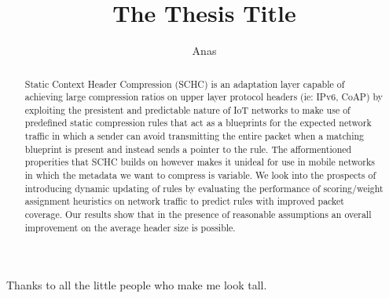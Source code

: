 \documentclass[12pt]{../dalthesis}
\begin{document}
\title{The Thesis Title}
\author{Anas}

\bcshon  %





\nolistoftables
\nolistoffigures

\frontmatter

\begin{abstract}
	Static Context Header Compression (SCHC) is an adaptation layer
		capable of achieving large compression ratios on upper layer protocol headers (ie: IPv6, CoAP) by exploiting the presistent and predictable nature of 
		IoT networks to make use of predefined static compression rules that act as a blueprints for the 
		expected network traffic in which a sender can avoid transmitting the entire packet when a matching blueprint is present and instead sends a pointer to the rule. The 
		afformentioned properities that SCHC builds on however makes it unideal for use in mobile networks in which the metadata we want to compress is variable.
		We look into the prospects of introducing dynamic updating of rules by evaluating the performance of scoring/weight assignment heuristics on
		network traffic to predict rules with improved packet coverage. Our results show that in the presence of reasonable assumptions an overall 
		improvement on the average header size is possible.\cite{latex-by-lamport} 

\end{abstract}

\begin{acknowledgements}
Thanks to all the little people who make me look tall.
\end{acknowledgements}
\end{document}
